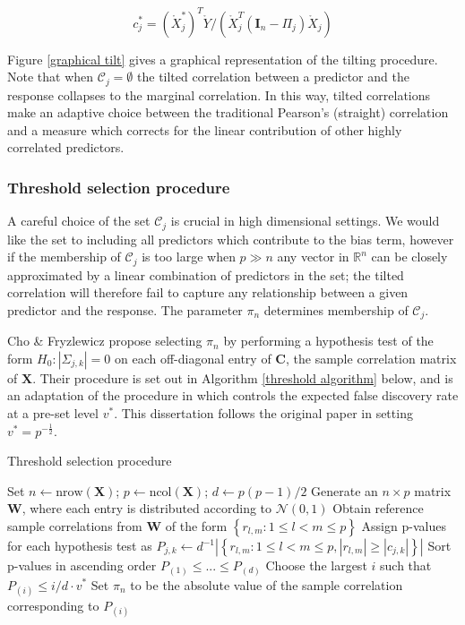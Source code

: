\documentclass[11pt]{report}\usepackage[utf8]{inputenc}
\begin{document}
\begin{equation*}
    c_j^* = \left ( \mathring{X}_j^* \right )^T\mathring{Y} / \left ( \mathring{X}_j^T (\boldsymbol{I}_n-\Pi_j) \mathring{X}_j \right )
\end{equation*}

Figure \ref{graphical tilt} gives a graphical representation of the tilting procedure. Note that when $\mathcal{C}_j = \emptyset$ the tilted correlation between a predictor and the response collapses to the marginal correlation. In this way, tilted correlations make an adaptive choice between the traditional Pearson's (straight) correlation and a measure which corrects for the linear contribution of other highly correlated predictors. 

\subsubsection{Threshold selection procedure}

A careful choice of the set $\mathcal{C}_j$ is crucial in high dimensional settings. We would like the set to including all predictors which contribute to the bias term, however if the membership of $\mathcal{C}_j$ is too large when $p \gg n$ any vector in $\mathbb{R}^n$ can be closely approximated by a linear combination of predictors in the set; the tilted correlation will therefore fail to capture any relationship between a given predictor and the response. The parameter $\pi_n$ determines membership of $\mathcal{C}_j$. 

Cho \& Fryzlewicz propose selecting $\pi_n$ by performing a hypothesis test of the form $H_0:\left | \Sigma_{j,k} \right | = 0 $ on each off-diagonal entry of $\boldsymbol{C}$, the sample correlation matrix of $\boldsymbol{X}$. Their procedure is set out in Algorithm \ref{threshold algorithm} below, and is an adaptation of the procedure in \cite{el2008spectrum} which controls the expected false discovery rate at a pre-set level $v^*$. This dissertation follows the original paper in setting $v^* = p^{-\frac{1}{2}}$. 

\begin{algorithm} 
\caption{Threshold selection procedure}
\begin{algorithmic}[1] \label{threshold algorithm}
  \scriptsize
  \STATE Set $n \leftarrow \text{nrow}(\boldsymbol{X})$; $p \leftarrow \text{ncol}(\boldsymbol{X})$; $d \leftarrow p(p-1)/2$
  \STATE Generate an $n \times p$ matrix $\boldsymbol{W}$, where each entry is distributed according to $\mathcal{N}(0,1)$
  \STATE Obtain reference sample correlations from $\boldsymbol{W}$ of the form $\left \{ r_{l,m} : 1\leq l< m \leq p \right \}$
  \STATE Assign p-values for each hypothesis test as $P_{j,k} \leftarrow d^{-1}\left | \left \{ r_{l,m} : 1 \leq l < m \leq p, \left | r_{l,m} \right | \geq \left | c_{j,k} \right | \right \} \right |$
  \STATE Sort p-values in ascending order $P_{(1)} \leq ... \leq P_{(d)}$
  \STATE Choose the largest $i$ such that $P_{(i)} \leq i / d \cdot v^*$
  \STATE Set $\pi_n$ to be the absolute value of the sample correlation corresponding to $P_{(i)}$
\end{algorithmic}
\end{algorithm}
\end{document}
